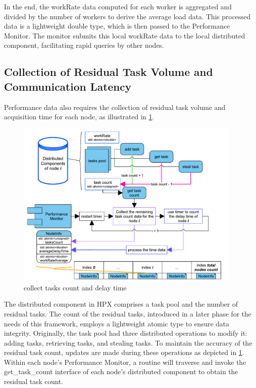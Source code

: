 \documentclass{mproj}
\begin{document}
In the end, the workRate data computed for each worker is aggregated and divided by the number of workers to derive the average load data.
This processed data is a lightweight double type, which is then passed to the Performance Monitor.
The monitor submits this local workRate data to the local distributed component, facilitating rapid queries by other nodes.

\subsection{Collection of Residual Task Volume and Communication Latency}\label{collect_tesks_delay}

Performance data also requires the collection of residual task volume and acquisition time for each node,
as illustrated in \ref{fig:tasks_detection}.

\begin{figure}[h]
    \centering
    \includegraphics[width=0.98\textwidth]{images/tasks_detection.pdf}
    \caption{collect tasks count and delay time}
    \label{fig:tasks_detection}
\end{figure}
\FloatBarrier

The distributed component in HPX comprises a task pool and the number of residual tasks.
The count of the residual tasks, introduced in a later phase for the needs of this framework,
employs a lightweight atomic type to ensure data integrity.
Originally, the task pool had three distributed operations to modify it:
adding tasks, retrieving tasks, and stealing tasks.
To maintain the accuracy of the residual task count,
updates are made during these operations as depicted in \ref{fig:tasks_detection}.
Within each node's Performance Monitor,
a routine will traverse and invoke the get\_task\_count interface of each node's distributed component to obtain the residual task count.
\end{document}
